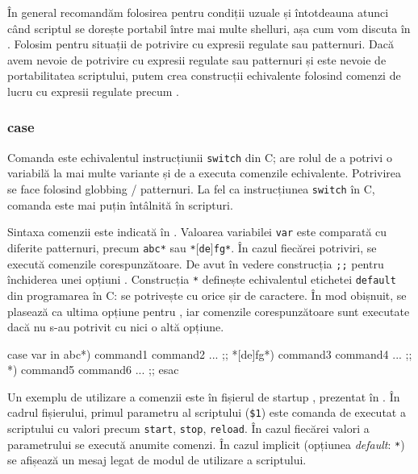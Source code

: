 În general recomandăm folosirea  pentru condiții uzuale și întotdeauna atunci când scriptul se dorește portabil între mai multe shelluri, așa cum vom discuta în .
Folosim \cmd{$[[$} pentru situații de potrivire cu expresii regulate sau patternuri.
Dacă avem nevoie de potrivire cu expresii regulate sau patternuri și este nevoie de portabilitatea scriptului, putem crea construcții echivalente folosind comenzi de lucru cu expresii regulate precum .

\subsubsection{case}
\label{sec:auto:script-func:flow-control:case}

Comanda  este echivalentul instrucțiunii \texttt{switch} din C; are rolul de a potrivi o variabilă la mai multe variante și de a executa comenzile echivalente.
Potrivirea se face folosind globbing / patternuri.
La fel ca instrucțiunea \texttt{switch} în C, comanda  este mai puțin întâlnită în scripturi.

Sintaxa comenzii  este indicată în .
Valoarea variabilei \texttt{var} este comparată cu diferite patternuri, precum \texttt{abc*} sau \texttt{*$[$de$]$fg*}.
În cazul fiecărei potriviri, se execută comenzile corespunzătoare.
De avut în vedere construcția \texttt{;;} pentru închiderea unei opțiuni .
Construcția \texttt{*} definește echivalentul etichetei \texttt{default} din programarea în C: se potrivește cu orice șir de caractere.
În mod obișnuit, se plasează ca ultima opțiune pentru , iar comenzile corespunzătoare sunt executate dacă nu s-au potrivit cu nici o altă opțiune.

\begin{screen}[caption={Sintaxa comenzii case},label={lst:auto:case-syntax}]
case var in
    abc*)
        command1
        command2
        ...
        ;;
    *[de]fg*)
        command3
        command4
        ...
        ;;
    *)
        command5
        command6
        ...
        ;;
esac
\end{screen}

Un exemplu de utilizare a comenzii  este în fișierul de startup , prezentat în .
În cadrul fișierului, primul parametru al scriptului (\texttt{\$1}) este comanda de executat a scriptului cu valori precum \texttt{start}, \texttt{stop}, \texttt{reload}.
În cazul fiecărei valori a parametrului se execută anumite comenzi.
În cazul implicit (opțiunea \textit{default}: \texttt{*}) se afișează un mesaj legat de modul de utilizare a scriptului.

